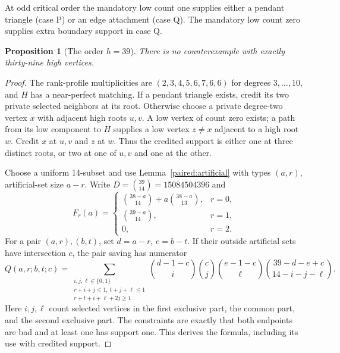 \documentclass[11pt,a4paper]{article}
\newtheorem{proposition}[theorem]{Proposition}
\theoremstyle{definition}\newtheorem{definition}[theorem]{Definition}
\theoremstyle{remark}\newtheorem{remark}[theorem]{Remark}
\begin{document}
At odd critical order the mandatory low count one supplies either
a pendant triangle (case P) or an edge attachment (case Q). The
mandatory low count zero supplies extra boundary support in case Q.

\begin{proposition}[The order $h=39$]\label{paired:h39}
There is no counterexample with exactly thirty-nine high vertices.
\end{proposition}
\begin{proof}
The rank-profile multiplicities are
$(2,3,4,5,6,7,6,6)$ for degrees $3,\ldots,10$, and $H$ has a
near-perfect matching. If a pendant triangle exists, credit its two
private selected neighbors at its root. Otherwise choose a private
degree-two vertex $x$ with adjacent high roots $u,v$. A low vertex
of count zero exists; a path from its low component to $H$ supplies
a low vertex $z\ne x$ adjacent to a high root $w$. Credit $x$ at
$u,v$ and $z$ at $w$. Thus the credited support is either one at
three distinct roots, or two at one of $u,v$ and one at the other.

Choose a uniform 14-subset and use
Lemma~\ref{paired:artificial} with types $(a,r)$, artificial-set size
$a-r$. Write $D=\binom{39}{14}=15084504396$ and
\[
 F_r(a)=\begin{cases}
 \binom{38-a}{14}+a\binom{38-a}{13},&r=0,\\
 \binom{39-a}{14},&r=1,\\
 0,&r=2.
 \end{cases}
\]
For a pair $(a,r),(b,t)$, set $d=a-r$, $e=b-t$. If their outside
artificial sets have intersection $c$, the pair saving has numerator
\begin{equation}\label{paired:Q-credit}
 Q(a,r;b,t;c)=
 \sum_{\substack{i,j,\ell\in\{0,1\}\\r+i+j\le1,\ t+j+\ell\le1\\
                         r+t+i+\ell+2j\ge1}}
 \binom{d-1-c}{i}\binom cj\binom{e-1-c}{\ell}
 \binom{39-d-e+c}{14-i-j-\ell}.
\end{equation}
Here $i,j,\ell$ count selected vertices in the first exclusive part,
the common part, and the second exclusive part. The constraints are
exactly that both endpoints are bad and at least one has support
one. This derives the formula, including its use with credited support.


\end{proof}
\end{document}

